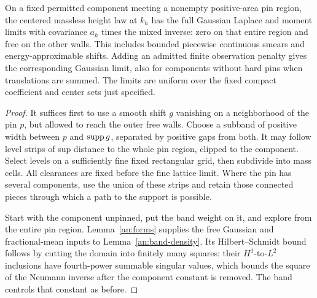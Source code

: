 \begin{proposition}\label{an:mixed-scaling}
On a fixed permitted component meeting a nonempty
positive-area pin region, the centered massless height
law at $k_h$ has the full Gaussian Laplace and moment
limits with covariance $a_h$ times the mixed inverse:
zero on that entire region and free on the other
walls.  This includes bounded piecewise continuous
smears and energy-approximable shifts.  Adding an admitted finite
observation penalty gives the corresponding Gaussian limit, also
for components without hard pins when translations are summed.
The limits are uniform over the fixed compact coefficient and center
sets just specified.
\end{proposition}

\begin{proof}
It suffices first to use a smooth shift $g$ vanishing
on a neighborhood of the pin $p$, but allowed to
reach the outer free walls.  Choose a subband of
positive width between $p$ and $\operatorname{supp} g$, separated
by positive gaps from both.  It may follow level
strips of sup distance to the whole pin region,
clipped to the component.  Select levels on a
sufficiently fine fixed rectangular grid, then
subdivide into mass cells.  All clearances are
fixed before the fine lattice limit.  Where the
pin has several components, use the union of
these strips and retain those connected pieces
through which a path to the support is possible.

Start with the component unpinned, put the band
weight on it, and explore from the entire pin
region.  Lemma~\ref{an:forms} supplies the free
Gaussian and fractional-mean inputs to
Lemma~\ref{an:band-density}.  Its Hilbert--Schmidt
bound follows by cutting the domain into finitely
many squares: their $H^1$-to-$L^2$ inclusions have
fourth-power summable singular values, which
bounds the square of the Neumann inverse after
the component constant is removed.  The band
controls that constant as before.


\end{proof}
